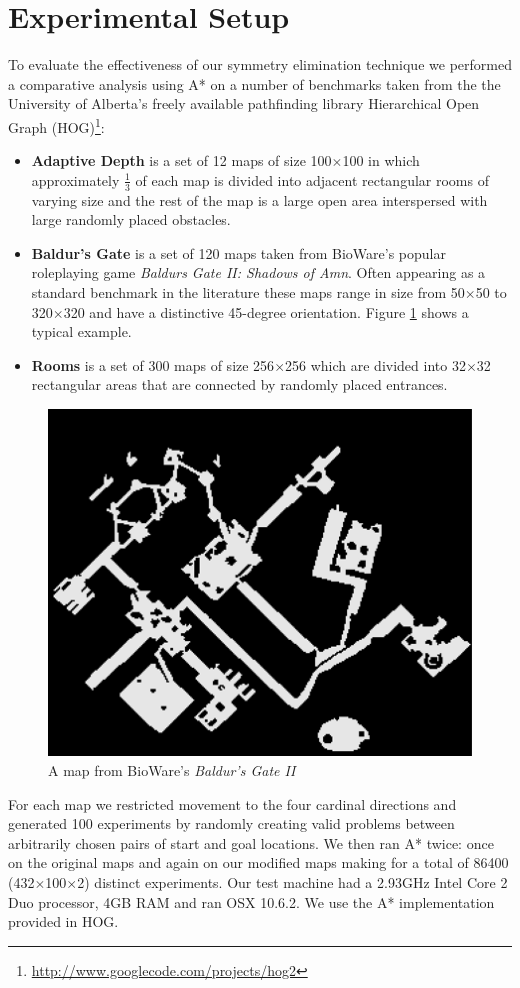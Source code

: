 \section{Experimental Setup}
To evaluate the effectiveness of our symmetry elimination technique we performed
a comparative analysis using A* on a number of benchmarks taken from the
the University of Alberta's freely available pathfinding library 
Hierarchical Open Graph (HOG)\footnote{\url{http://www.googlecode.com/projects/hog2}}:
\begin{itemize}
\item{\textbf{Adaptive Depth} is a set of 12 maps of size 100$\times$100 in which approximately
$\frac{1}{3}$ of each map is divided into adjacent rectangular rooms of
varying size and the rest of the map is a large open area interspersed with 
large randomly placed obstacles.}
\item{\textbf{Baldur's Gate} is a set of 120 maps taken from BioWare's popular
roleplaying game \emph{Baldurs Gate II: Shadows of Amn}. 
Often appearing as a standard benchmark in the literature 
\cite{botea04,bjornsson05,bjornsson06,sturtevant05,harabor08} these maps range in 
size from 50$\times$50 to 320$\times$320 and have a distinctive 45-degree orientation.
Figure \ref{fig-bgmap} shows a typical example.}
\item{\textbf{Rooms} is a set of 300 maps of size 256$\times$256 which are divided into 32$\times$32
rectangular areas that are connected by randomly placed entrances.}
\end{itemize}

 \begin{figure}[t]
        \begin{center}
                        \includegraphics[width=0.6\columnwidth, trim = 10mm 10mm 10mm 0mm]{diagrams/bgmap.png}
        \end{center}
        \caption{A map from BioWare's \emph{Baldur's Gate II}}
        \label{fig-bgmap}
 \end{figure}
\par
For each map we restricted movement to the four cardinal directions and generated 100 experiments by 
randomly creating valid problems between arbitrarily chosen pairs of start and goal locations.
We then ran A* twice: once on the original maps and again on our modified maps making for
a total of 86400 (432$\times$100$\times$2) distinct experiments.
Our test machine had a 2.93GHz Intel Core 2 Duo processor, 4GB RAM and
ran OSX 10.6.2.
We use the A* implementation provided in HOG.
